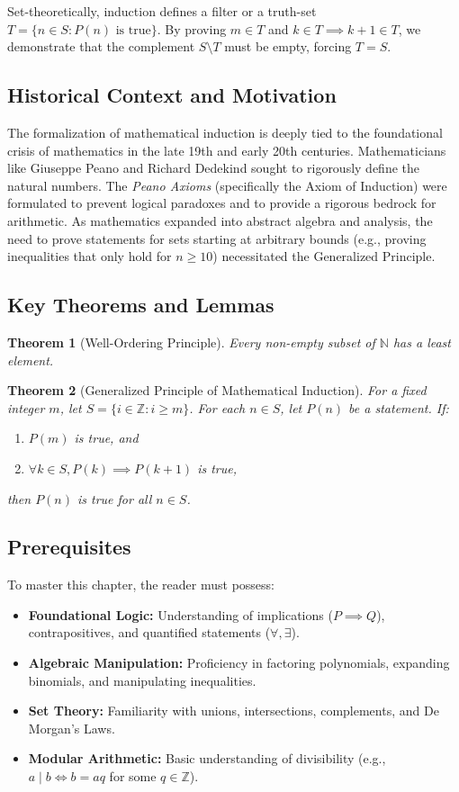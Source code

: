 \documentclass[11pt, a4paper]{article}
\newtheorem{theorem}{Theorem}[section]
\theoremstyle{definition}
\theoremstyle{remark}
\newcommand{\N}{\mathbb{N}}
\newcommand{\Z}{\mathbb{Z}}
\begin{document}
Set-theoretically, induction defines a filter or a truth-set $T = \{n \in S : P(n) \text{ is true}\}$. By proving $m \in T$ and $k \in T \implies k+1 \in T$, we demonstrate that the complement $S \setminus T$ must be empty, forcing $T = S$.

\subsection{Historical Context and Motivation}
The formalization of mathematical induction is deeply tied to the foundational crisis of mathematics in the late 19th and early 20th centuries. Mathematicians like Giuseppe Peano and Richard Dedekind sought to rigorously define the natural numbers. The \textit{Peano Axioms} (specifically the Axiom of Induction) were formulated to prevent logical paradoxes and to provide a rigorous bedrock for arithmetic. As mathematics expanded into abstract algebra and analysis, the need to prove statements for sets starting at arbitrary bounds (e.g., proving inequalities that only hold for $n \ge 10$) necessitated the Generalized Principle.

\subsection{Key Theorems and Lemmas}
\begin{theorem}[Well-Ordering Principle]
Every non-empty subset of $\N$ has a least element.
\end{theorem}

\begin{theorem}[Generalized Principle of Mathematical Induction]
For a fixed integer $m$, let $S = \{i \in \Z : i \ge m\}$. For each $n \in S$, let $P(n)$ be a statement. If:
\begin{enumerate}
    \item $P(m)$ is true, and
    \item $\forall k \in S, P(k) \implies P(k+1)$ is true,
\end{enumerate}
then $P(n)$ is true for all $n \in S$.
\end{theorem}

\subsection{Prerequisites}
To master this chapter, the reader must possess:
\begin{itemize}
    \item \textbf{Foundational Logic:} Understanding of implications ($P \implies Q$), contrapositives, and quantified statements ($\forall, \exists$).
    \item \textbf{Algebraic Manipulation:} Proficiency in factoring polynomials, expanding binomials, and manipulating inequalities.
    \item \textbf{Set Theory:} Familiarity with unions, intersections, complements, and De Morgan's Laws.
    \item \textbf{Modular Arithmetic:} Basic understanding of divisibility (e.g., $a \mid b \iff b = aq$ for some $q \in \Z$).
\end{itemize}
\end{document}
